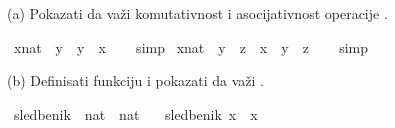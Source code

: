 %
\begin{isabellebody}%
%
%
\isadelimtheory
%
\endisadelimtheory
%
\isatagtheory
%
\endisatagtheory
{\isafoldtheory}%
%
\isadelimtheory
%
\endisadelimtheory
%
\begin{exercise}[subtitle=Primer jednostavne teorije]
%
\begin{isamarkuptext}%
(a) Pokazati da važi komutativnost i asocijativnost 
          operacije .%
\end{isamarkuptext}\isamarkuptrue%
\isamarkupfalse%
\ {\isachardoublequoteopen}{\isacharparenleft}{\kern0pt}x{\isacharcolon}{\kern0pt}{\isacharcolon}{\kern0pt}nat{\isacharparenright}{\kern0pt}\ {\isacharplus}{\kern0pt}\ y\ {\isacharequal}{\kern0pt}\ y\ {\isacharplus}{\kern0pt}\ x{\isachardoublequoteclose}\isanewline
%
\isadelimproof
\ \ %
\endisadelimproof
%
\isatagproof
{}\isamarkupfalse%
\ simp%
\endisatagproof
{\isafoldproof}%
%
\isadelimproof
\isanewline
%
\endisadelimproof
\isanewline
{}\isamarkupfalse%
\ {\isachardoublequoteopen}{\isacharparenleft}{\kern0pt}{\isacharparenleft}{\kern0pt}x{\isacharcolon}{\kern0pt}{\isacharcolon}{\kern0pt}nat{\isacharparenright}{\kern0pt}\ {\isacharplus}{\kern0pt}\ y{\isacharparenright}{\kern0pt}\ {\isacharplus}{\kern0pt}\ z\ {\isacharequal}{\kern0pt}\ x\ {\isacharplus}{\kern0pt}\ {\isacharparenleft}{\kern0pt}y\ {\isacharplus}{\kern0pt}\ z{\isacharparenright}{\kern0pt}{\isachardoublequoteclose}\isanewline
%
\isadelimproof
\ \ %
\endisadelimproof
%
\isatagproof
{}\isamarkupfalse%
\ simp%
\endisatagproof
{\isafoldproof}%
%
\isadelimproof
%
\endisadelimproof
%
\begin{isamarkuptext}%
(b) Definisati funkciju  i 
          pokazati da važi .%
\end{isamarkuptext}\isamarkuptrue%
\isamarkupfalse%
\ sledbenik\ {\isacharcolon}{\kern0pt}{\isacharcolon}{\kern0pt}\ {\isachardoublequoteopen}nat\ {\isasymRightarrow}\ nat{\isachardoublequoteclose}\ \isanewline
\ \ {\isachardoublequoteopen}sledbenik\ x\ {\isacharequal}{\kern0pt}\ x\ {\isacharplus}{\kern0pt}\ {}{\isachardoublequoteclose}\isanewline

\end{exercise}
\end{isabellebody}
